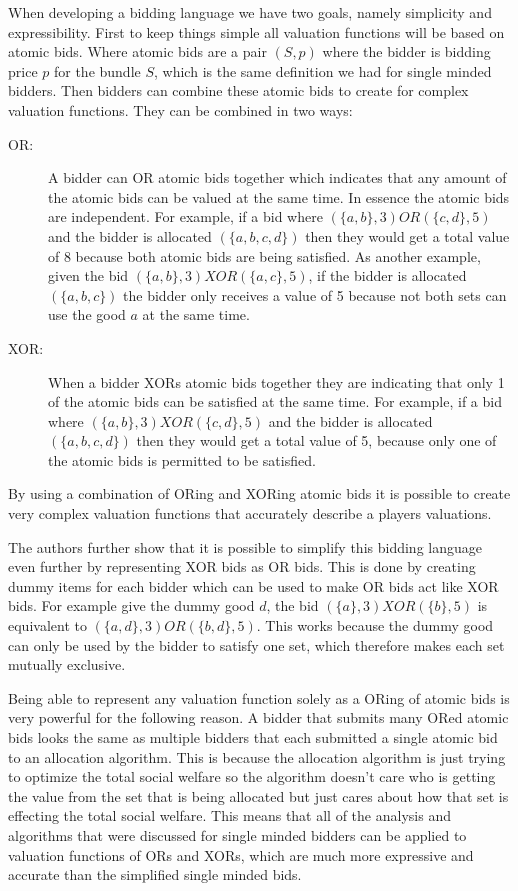 \documentclass[10pt,onecolumn,letterpaper]{article}
\theoremstyle{definition}
\begin{document}
When developing a bidding language we have two goals, namely simplicity and expressibility. First to keep things simple all valuation functions will be based on atomic bids. Where atomic bids are a pair $(S,p)$ where the bidder is bidding price $p$ for the bundle $S$, which is the same definition we had for single minded bidders. Then bidders can combine these atomic bids to create for complex valuation functions. They can be combined in two ways:

\begin{description}
  \item [OR:] A bidder can OR atomic bids together which indicates that any amount of the atomic bids can be valued at the same time. In essence the atomic bids are independent. For example, if a bid where $(\{a,b\}, 3) OR (\{c,d\}, 5)$ and the bidder is allocated $(\{a,b,c,d\})$ then they would get a total value of 8 because both atomic bids are being satisfied. As another example, given the bid $(\{a,b\}, 3) XOR (\{a,c\}, 5)$, if the bidder is allocated $(\{a,b,c\})$ the bidder only receives a value of 5 because not both sets can use the good $a$ at the same time. 

  \item [XOR:] When a bidder XORs atomic bids together they are indicating that only 1 of the atomic bids can be satisfied at the same time. For example, if a bid where $(\{a,b\}, 3) XOR (\{c,d\}, 5)$ and the bidder is allocated $(\{a,b,c,d\})$ then they would get a total value of 5, because only one of the atomic bids is permitted to be satisfied. 

\end{description}

By using a combination of ORing and XORing atomic bids it is possible to create very complex valuation functions that accurately describe a players valuations.

The authors further show that it is possible to simplify this bidding language even further by representing XOR bids as OR bids. This is done by creating dummy items for each bidder which can be used to make OR bids act like XOR bids. For example give the dummy good $d$, the bid $(\{a\}, 3) XOR (\{b\}, 5)$ is equivalent to $(\{a,d\}, 3) OR (\{b,d\}, 5)$. This works because the dummy good can only be used by the bidder to satisfy one set, which therefore makes each set mutually exclusive. 

Being able to represent any valuation function solely as a ORing of atomic bids is very powerful for the following reason. A bidder that submits many ORed atomic bids looks the same as multiple bidders that each submitted a single atomic bid to an allocation algorithm. This is because the allocation algorithm is just trying to optimize the total social welfare so the algorithm doesn't care who is getting the value from the set that is being allocated but just cares about how that set is effecting the total social welfare. This means that all of the analysis and algorithms that were discussed for single minded bidders can be applied to valuation functions of ORs and XORs, which are much more expressive and accurate than the simplified single minded bids. 
\end{document}

